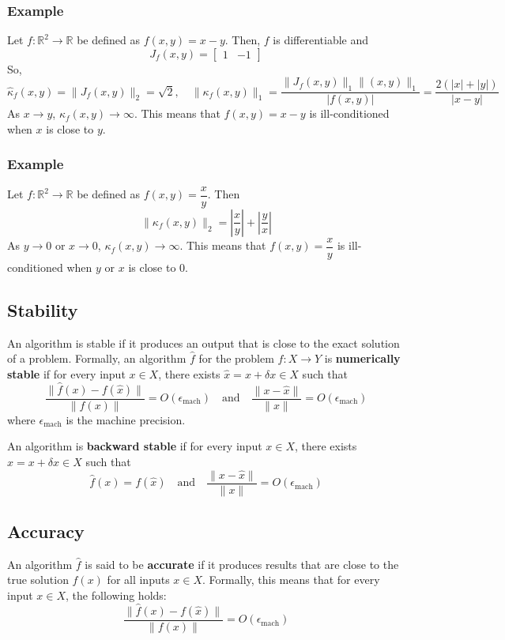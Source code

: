 \documentclass[11pt]{article}
\begin{document}
\subsubsection*{Example}
Let \( f : \mathbb{R}^2 \to \mathbb{R} \) be defined as \( f(x,y) = x - y \). Then, \( f \) is differentiable and
\[J_f(x,y) = \begin{bmatrix}1 & -1\end{bmatrix}\]
So,
\[\hat{\kappa}_f(x,y) = \|J_f(x,y)\|_2 = \sqrt{2}, \quad \|\kappa_f(x,y)\|_1 = \frac{\|J_f(x,y)\|_1 \|(x,y)\|_1}{|f(x,y)|} = \frac{2(|x| + |y|)}{|x - y|}\]
As \( x \to y \), \( \kappa_f(x,y) \to \infty \). This means that \( f(x,y) = x - y \) is ill-conditioned when \( x \) is close to \( y \).

\subsubsection*{Example}
Let \( f : \mathbb{R}^2 \to \mathbb{R} \) be defined as \( f(x,y) = \dfrac{x}{y} \). Then
\[\|\kappa_f(x,y)\|_2 = \left|\frac{x}{y}\right| + \left|\frac{y}{x}\right|\]
As \( y \to 0 \) or \( x \to 0 \), \( \kappa_f(x,y) \to \infty \). This means that \( f(x,y) = \dfrac{x}{y} \) is ill-conditioned when \( y \) or \( x \) is close to \( 0 \).

\subsection{Stability}
An algorithm is stable if it produces an output that is close to the exact solution of a problem. Formally, an algorithm \( \hat{f} \) for the problem \( f : X \to Y \) is \textbf{numerically stable} if for every input \( x \in X \), there exists \(\hat{x} = x + \delta x \in X\) such that
\[\frac{\|\hat{f}(x) - f(\hat{x})\|}{\|f(x)\|} = O(\epsilon_{\text{mach}}) \quad \text{and} \quad \frac{\|x - \hat{x}\|}{\|x\|} = O(\epsilon_{\text{mach}})\]
where \( \epsilon_{\text{mach}} \) is the machine precision.

An algorithm is \textbf{backward stable} if for every input \( x \in X \), there exists \(\hat{x} = x + \delta x \in X\) such that  
\[\hat{f}(x) = f(\hat{x}) \quad \text{and} \quad \frac{\|x - \hat{x}\|}{\|x\|} = O(\epsilon_{\text{mach}})\]

\subsection{Accuracy}
An algorithm \( \hat{f} \) is said to be \textbf{accurate} if it produces results that are close to the true solution \( f(x) \) for all inputs \( x \in X \). Formally, this means that for every input \( x \in X \), the following holds:
\[\frac{\|\hat{f}(x) - f(\hat{x})\|}{\|f(x)\|} = O(\epsilon_{\text{mach}})\]
\end{document}
